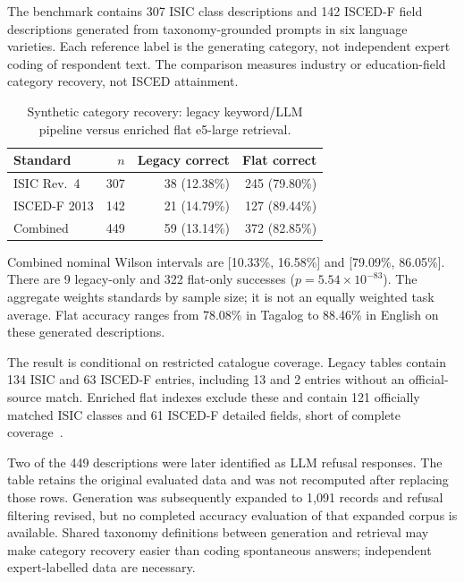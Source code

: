 The benchmark contains 307 ISIC class descriptions and 142 ISCED-F
field descriptions generated from taxonomy-grounded prompts in six
language varieties. Each reference label is the generating category,
not independent expert coding of respondent text. The comparison measures
industry or education-field category recovery, not ISCED attainment.

\begin{table}[htbp]
\centering
\caption{Synthetic category recovery: legacy keyword/LLM pipeline versus
enriched flat e5-large retrieval.}
\label{tab:ch6-synthetic}
\small\renewcommand{\arraystretch}{1.3}
\begin{tabular}{lrrr}
\toprule
\textbf{Standard} & \textbf{$n$} & \textbf{Legacy correct} & \textbf{Flat correct} \\
\midrule
ISIC Rev.~4 & 307 & 38 (12.38\%) & 245 (79.80\%) \\
ISCED-F 2013 & 142 & 21 (14.79\%) & 127 (89.44\%) \\
\midrule
Combined & 449 & 59 (13.14\%) & 372 (82.85\%) \\
\bottomrule
\end{tabular}
\end{table}

Combined nominal Wilson intervals are [10.33\%, 16.58\%] and
[79.09\%, 86.05\%]. There are 9 legacy-only and 322 flat-only successes
($p=5.54\times10^{-83}$). The aggregate weights standards by sample size;
it is not an equally weighted task average. Flat accuracy ranges from
78.08\% in Tagalog to 88.46\% in English on these generated descriptions.

The result is conditional on restricted catalogue coverage. Legacy tables
contain 134 ISIC and 63 ISCED-F entries, including 13 and 2 entries without
an official-source match. Enriched flat indexes exclude these and contain
121 officially matched ISIC classes and 61 ISCED-F detailed fields,
short of complete coverage~\cite{unsd2008isic,unesco2015iscedf}.

Two of the 449 descriptions were later identified as LLM refusal responses.
The table retains the original evaluated data and was not recomputed after
replacing those rows. Generation was subsequently expanded to 1,091
records and refusal filtering revised, but no completed accuracy evaluation
of that expanded corpus is available. Shared taxonomy definitions between
generation and retrieval may make category recovery easier than coding
spontaneous answers; independent expert-labelled data are necessary.

